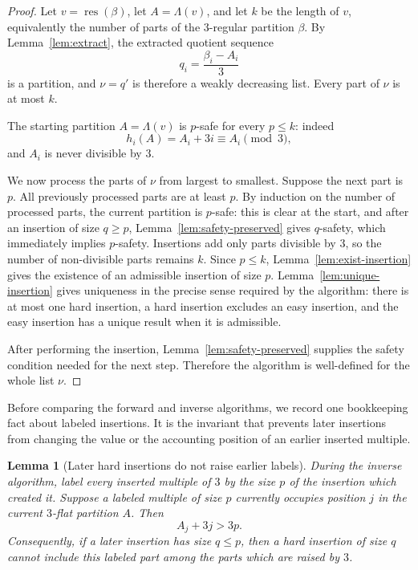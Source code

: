 \documentclass[11pt]{amsart}
\newtheorem{lemma}[theorem]{Lemma}
\theoremstyle{definition}
\theoremstyle{remark}
\newcommand{\res}{\operatorname{res}}
\begin{document}
\begin{proof}
Let \(v=\res(\beta)\), let \(A=\Lambda(v)\), and let \(k\) be the length of
\(v\), equivalently the number of parts of the \(3\)-regular partition
\(\beta\).  By Lemma~\ref{lem:extract}, the extracted quotient sequence
\[
        q_i=\frac{\beta_i-A_i}{3}
\]
is a partition, and \(\nu=q'\) is therefore a weakly decreasing list.  Every
part of \(\nu\) is at most \(k\).

The starting partition \(A=\Lambda(v)\) is \(p\)-safe for every \(p\le k\):
indeed
\[
        h_i(A)=A_i+3i\equiv A_i\pmod3,
\]
and \(A_i\) is never divisible by \(3\).

We now process the parts of \(\nu\) from largest to smallest.  Suppose the next
part is \(p\).  All previously processed parts are at least \(p\).  By induction
on the number of processed parts, the current partition is \(p\)-safe: this is
clear at the start, and after an insertion of size \(q\ge p\),
Lemma~\ref{lem:safety-preserved} gives \(q\)-safety, which immediately implies
\(p\)-safety.  Insertions add only parts divisible by \(3\), so the number of
non-divisible parts remains \(k\).  Since \(p\le k\), Lemma~\ref{lem:exist-insertion}
gives the existence of an admissible insertion of size \(p\).  Lemma~\ref{lem:unique-insertion}
gives uniqueness in the precise sense required by the algorithm: there is at
most one hard insertion, a hard insertion excludes an easy insertion, and the
easy insertion has a unique result when it is admissible.

After performing the insertion, Lemma~\ref{lem:safety-preserved} supplies the
safety condition needed for the next step.  Therefore the algorithm is
well-defined for the whole list \(\nu\).
\end{proof}


Before comparing the forward and inverse algorithms, we record one bookkeeping fact about labeled insertions.  It is the invariant that prevents later insertions from changing the value or the accounting position of an earlier inserted multiple.

\begin{lemma}[Later hard insertions do not raise earlier labels]\label{lem:no-raise-labels}
During the inverse algorithm, label every inserted multiple of $3$ by the size $p$ of the insertion which created it.  Suppose a labeled multiple of size $p$ currently occupies position $j$ in the current $3$-flat partition $A$.  Then
\[
        A_j+3j>3p.
\]
Consequently, if a later insertion has size $q\le p$, then a hard insertion of size $q$ cannot include this labeled part among the parts which are raised by $3$.
\end{lemma}
\end{document}
